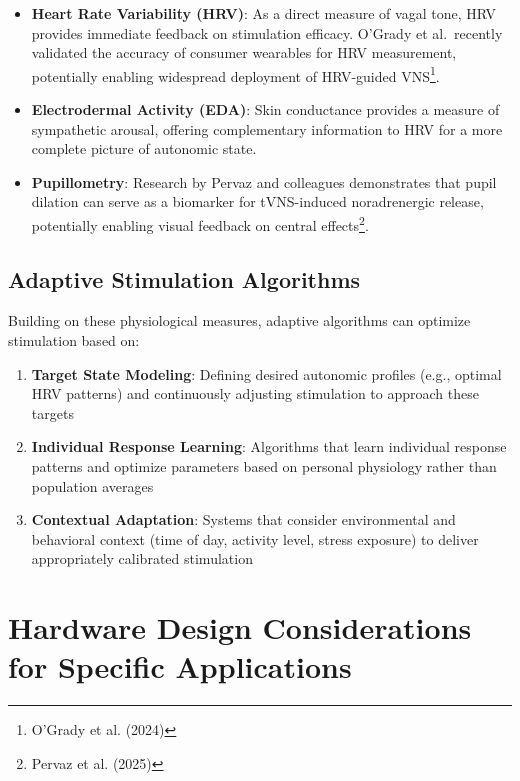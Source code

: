 \documentclass[
  Letterpaper,
]{scrbook}
\begin{document}
\begin{itemize}
\item
  \textbf{Heart Rate Variability (HRV)}: As a direct measure of vagal
  tone, HRV provides immediate feedback on stimulation efficacy. O'Grady
  et al.~recently validated the accuracy of consumer wearables for HRV
  measurement, potentially enabling widespread deployment of HRV-guided
  VNS\footnote{O'Grady et al. (2024)}.
\item
  \textbf{Electrodermal Activity (EDA)}: Skin conductance provides a
  measure of sympathetic arousal, offering complementary information to
  HRV for a more complete picture of autonomic state.
\item
  \textbf{Pupillometry}: Research by Pervaz and colleagues demonstrates
  that pupil dilation can serve as a biomarker for tVNS-induced
  noradrenergic release, potentially enabling visual feedback on central
  effects\footnote{Pervaz et al. (2025)}.
\end{itemize}

\subsection{Adaptive Stimulation
Algorithms}\label{adaptive-stimulation-algorithms}

Building on these physiological measures, adaptive algorithms can
optimize stimulation based on:

\begin{enumerate}
\def\labelenumi{\arabic{enumi}.}
\item
  \textbf{Target State Modeling}: Defining desired autonomic profiles
  (e.g., optimal HRV patterns) and continuously adjusting stimulation to
  approach these targets
\item
  \textbf{Individual Response Learning}: Algorithms that learn
  individual response patterns and optimize parameters based on personal
  physiology rather than population averages
\item
  \textbf{Contextual Adaptation}: Systems that consider environmental
  and behavioral context (time of day, activity level, stress exposure)
  to deliver appropriately calibrated stimulation
\end{enumerate}

\section{Hardware Design Considerations for Specific
Applications}\label{hardware-design-considerations-for-specific-applications}
\end{document}
